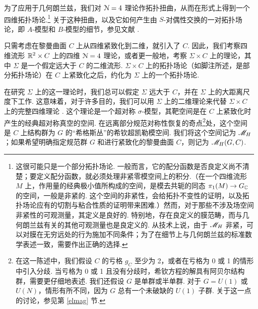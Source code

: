 为了应用于几何朗兰兹，我们对 ${\cal N}=4$ 理论作拓扑扭曲，从而在形式上得到一个四维拓扑场论.\footnote{\label{partial}这很可能只是一个部分拓扑场论. 一般而言，它的配分函数是否良定义尚不清楚；要定义配分函数，就必须处理非紧零模空间上的积分.（在一个四维流形 $M$ 上，作用量的经典极小值所构成的空间，是模去共轭的同态 $\pi_1(M)\to G_{\mathbb C}$ 的空间，一般是非紧的. 这个空间的非紧性，会给拓扑不变性的证明，以及拓扑场论应有的切割与粘合性质的证明带来困难.）然而，对于那些不涉及场空间非紧性的可观测量，其定义是良好的. 特别地，存在良定义的膜范畴，而与几何朗兰兹有关的其他可观测量也是良定义的. 从技术上说，由于 ${{\mathscr{M}}_H}$ 非紧，可以对膜在无穷远处的行为施加不同条件；为了在细节上与几何朗兰兹的标准数学表述一致，需要作出正确的选择.} 关于这种扭曲，以及它如何产生由 $S$-对偶性交换的一对拓扑场论，即 $A$-模型和 $B$-模型的细节，参见文献 \cite{KW}.

只需考虑在黎曼曲面 $C$ 上从四维紧致化到二维，就引入了 $C$. 因此，我们考察四维流形 ${\mathbb R}^2\times C$ 上的四维 ${\cal N}=4$ 理论，或者更一般地，考察 $\Sigma\times C$ 上的理论，其中 $\Sigma$ 是一个假定远大于 $C$ 的二维流形. $\Sigma\times C$ 上的拓扑场论（如脚注所述，是部分拓扑场论）在 $C$ 上紧致化之后，约化为 $\Sigma$ 上的一个拓扑场论.

在研究 $\Sigma$ 上的这一理论时，我们总可以假定 $\Sigma$ 远大于 $C$，并在 $\Sigma$ 上的大距离尺度下工作. 这意味着，对于许多目的，我们可以用 $\Sigma$ 上的二维理论来代替 $\Sigma\times C$ 上的完整四维理论 \cite{BJSV,HMS}. 这个理论是一个超对称 $\sigma$-模型，其靶空间是在 $C$ 上紧致化时产生的经典超对称真空的空间. 在远离部分规范对称性恢复的奇点\footnote{在这一陈述中，我们假设 $C$ 的亏格 $g_C$ 至少为 2，或者在亏格为 0 或 1 的情形中引入分歧. 当亏格为 0 或 1 且没有分歧时，希钦方程的解具有阿贝尔结构群，需要更仔细地表述. 我们还假设 $G$ 是单群或半单群. 对于 $G=U(1)$ 或 $U(N)$，情形有所不同，因为 $G$ 总有一个未破缺的 $U(1)$ 子群. 关于这一点的讨论，参见第 \ref{elmag} 节.}处，这个空间是 $C$ 上结构群为 $G$ 的“希格斯丛”的希钦超凯勒模空间. 我们将这个空间记为 ${{\mathscr{M}}_H}$；如果希望明确指定规范群 $G$ 和进行紧致化的黎曼曲面 $C$，则记为 ${{\mathscr{M}}_H}(G,C)$.


